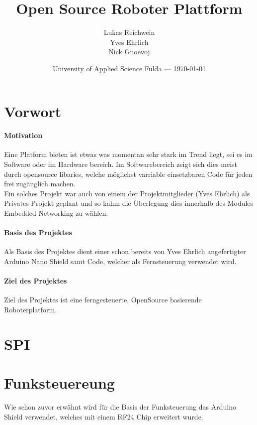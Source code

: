 \documentclass{article}
\title{Open Source Roboter Plattform} %
\author{Lukas Reichwein\\ Yves Ehrlich\\ Nick Gnoevoj}
\date{University of Applied Science Fulda --- \today} %
\begin{document}
\maketitle %
\tableofcontents %
\newpage


\section{Vorwort} %
    \paragraph{Motivation}
    Eine Platform bieten ist etwas was momentan sehr stark im Trend liegt, sei es im Software oder im Hardware bereich. Im Softwarebereich zeigt sich dies meist durch opensource libaries, welche möglichst varriable einsetzbaren Code für jeden frei zugänglich machen. \\    
    Ein solches Projekt war auch von einem der Projektmitglieder (Yves Ehrlich) als Privates Projekt geplant und so kahm die Überlegung dies innerhalb des Modules Embedded Networking zu wählen.\linebreak
    \paragraph{Basis des Projektes}
    Als Basis des Projektes dient einer schon bereits von Yves Ehrlich angefertigter Arduino Nano Shield samt Code,
    \cite{nanoGame} welcher als Fernsteuerung verwendet wird. 
    \paragraph{Ziel des Projektes}	
	Ziel des Projektes ist eine ferngesteuerte, OpenSource basierende Roboterplatform.

\newpage    
\section{SPI}%

\newpage
\section{Funksteuereung} %
    Wie schon zuvor erwähnt wird für die Basis der Funksteuerung das Arduino Shield verwendet, welches mit einem RF24 Chip erweitert wurde.
\end{document}
